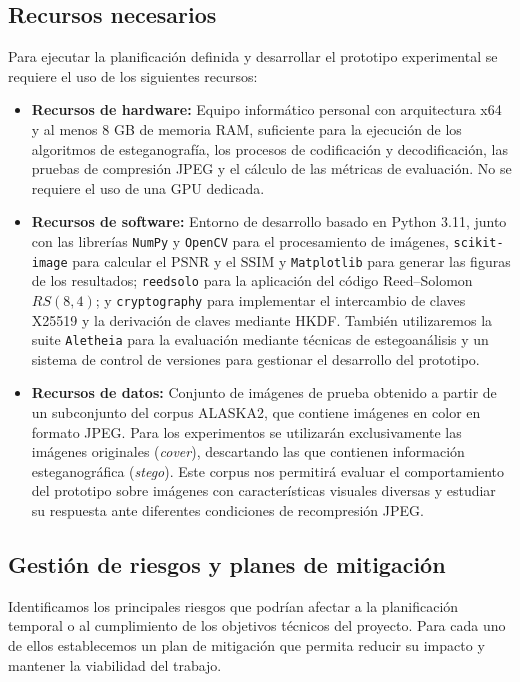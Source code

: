 \documentclass[IB]{TFUOC}%
\begin{document}
\subsection{Recursos necesarios}

Para ejecutar la planificación definida y desarrollar el prototipo experimental se requiere el uso de los siguientes recursos:

\begin{itemize}

\item \textbf{Recursos de hardware:} Equipo informático personal con arquitectura x64 y al menos 8 GB de memoria RAM, suficiente para la ejecución de los algoritmos de esteganografía, los procesos de codificación y decodificación, las pruebas de compresión JPEG y el cálculo de las métricas de evaluación. No se requiere el uso de una $\mathrm{GPU}$ dedicada.
\item \textbf{Recursos de software:} Entorno de desarrollo basado en Python 3.11, junto con las librerías \texttt{NumPy} y \texttt{OpenCV} para el procesamiento de imágenes, \texttt{scikit-image} para calcular el $\mathrm{PSNR}$ y el $\mathrm{SSIM}$ y \texttt{Matplotlib} para generar las figuras de los resultados; \texttt{reedsolo} para la aplicación del código Reed--Solomon $RS(8,4)$; y \texttt{cryptography} para implementar el intercambio de claves X25519 y la derivación de claves mediante HKDF. También utilizaremos la suite \texttt{Aletheia} \cite{1} para la evaluación mediante técnicas de estegoanálisis y un sistema de control de versiones para gestionar el desarrollo del prototipo.
\item \textbf{Recursos de datos:} Conjunto de imágenes de prueba obtenido a partir de un subconjunto del corpus ALASKA2, que contiene imágenes en color en formato JPEG. Para los experimentos se utilizarán exclusivamente las imágenes originales (\textit{cover}), descartando las que contienen información esteganográfica (\textit{stego}). Este corpus nos permitirá evaluar el comportamiento del prototipo sobre imágenes con características visuales diversas y estudiar su respuesta ante diferentes condiciones de recompresión JPEG.
\end{itemize}

\subsection{Gestión de riesgos y planes de mitigación}

Identificamos los principales riesgos que podrían afectar a la planificación temporal o al cumplimiento de los objetivos técnicos del proyecto. Para cada uno de ellos establecemos un plan de mitigación que permita reducir su impacto y mantener la viabilidad del trabajo.
\end{document}
